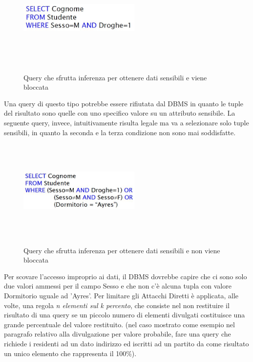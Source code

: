 \begin{figure}[htbp]
	\centering
	{\includegraphics[height=5cm, width=6cm, keepaspectratio]{Immagini/Appendice1/prot_dati_04.JPG}}
				\caption{Query che sfrutta inferenza per ottenere dati sensibili e viene bloccata \label{fig:query_inferenza}}
\end{figure}

Una query di questo tipo potrebbe essere rifiutata dal DBMS in quanto le tuple del risultato sono quelle con uno specifico valore su un attributo sensibile. La seguente query, invece, intuitivamente risulta legale ma va a selezionare solo tuple sensibili, in quanto la seconda e la terza condizione non sono mai soddisfatte.

\begin{figure}[htbp]
	\centering
	{\includegraphics[height=5cm, width=6cm, keepaspectratio]{Immagini/Appendice1/prot_dati_05.JPG}}
				\caption{Query che sfrutta inferenza per ottenere dati sensibili e non viene bloccata \label{fig:query_inferenza1}}
\end{figure}

Per scovare l'accesso improprio ai dati, il DBMS dovrebbe capire che ci sono solo due valori ammessi per il campo Sesso e che non c'è alcuna tupla con valore Dormitorio uguale ad 'Ayres'. Per limitare gli Attacchi Diretti è applicata, alle volte, una regola \textit{n elementi sul k percento}, che consiste nel non restituire il risultato di una query se un piccolo numero di elementi divulgati costituisce una grande percentuale del valore restituito. (nel caso mostrato come esempio nel paragrafo relativo alla divulgazione per valore probabile, fare una query che richiede i residenti ad un dato indirizzo ed iscritti ad un partito da come risultato un unico elemento che rappresenta il 100\%).

